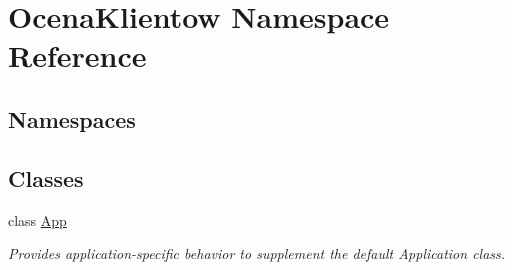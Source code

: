 \hypertarget{namespace_ocena_klientow}{}\section{Ocena\+Klientow Namespace Reference}
\label{namespace_ocena_klientow}
\subsection*{Namespaces}
\begin{DoxyCompactItemize}
\end{DoxyCompactItemize}
\subsection*{Classes}
\begin{DoxyCompactItemize}
\item 
class \hyperlink{class_ocena_klientow_1_1_app}{App}
\begin{DoxyCompactList}\small\item\em Provides application-\/specific behavior to supplement the default Application class. \end{DoxyCompactList}\end{DoxyCompactItemize}
